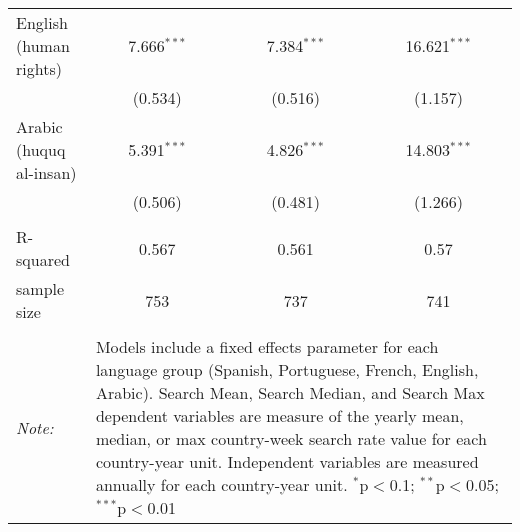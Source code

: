 \begin{table}[!htbp]
\begin{tabular}{@{\extracolsep{5pt}}lccc}
  English (human rights) & 7.666$^{***}$ & 7.384$^{***}$ & 16.621$^{***}$ \\ 
  & (0.534) & (0.516) & (1.157) \\ 
  Arabic (huquq al-insan) & 5.391$^{***}$ & 4.826$^{***}$ & 14.803$^{***}$ \\ 
  & (0.506) & (0.481) & (1.266) \\ 
 \hline \\[-1.8ex] 
R-squared  & 0.567 & 0.561 & 0.57 \\ 
sample size  & 753 & 737 & 741 \\ 
\hline 
\hline \\[-1.8ex] 
\textit{Note:}  & \multicolumn{3}{l}{\parbox[t]{8cm}{Models include a fixed effects parameter for each language group (Spanish, Portuguese, French, English, Arabic). Search Mean, Search Median, and Search Max dependent variables are measure of the yearly mean, median, or max country-week search rate value for each country-year unit. Independent variables are measured annually for each country-year unit. $^{*}$p$<$0.1; $^{**}$p$<$0.05; $^{***}$p$<$0.01}} \\ 
\end{tabular} 
\end{table} 
